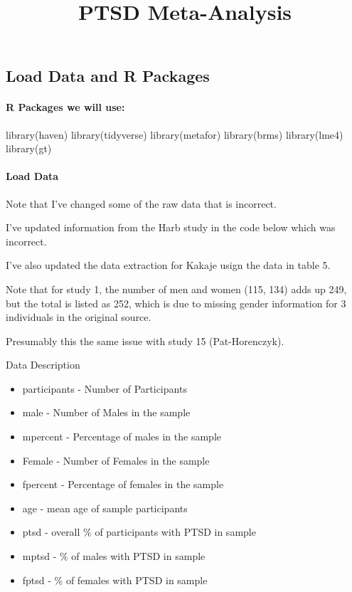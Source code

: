 \documentclass[
  letterpaper,
  DIV=11,
  numbers=noendperiod]{scrartcl}
\title{PTSD Meta-Analysis}
\author{}
\date{}
\let\oldparagraph\paragraph
\renewcommand{\paragraph}[1]{\oldparagraph{#1}\mbox{}}
\newenvironment{Shaded}{\begin{snugshade}}{\end{snugshade}}
\newcommand{\FunctionTok}[1]{\textcolor[rgb]{0.28,0.35,0.67}{#1}}
\newcommand{\NormalTok}[1]{\textcolor[rgb]{0.00,0.23,0.31}{#1}}
\renewcommand*\contentsname{Table of contents}
\newcommand\contentsname{Table of contents}
\begin{document}
\maketitle

\renewcommand*\contentsname{Table of contents}
{
\hypersetup{linkcolor=}
\setcounter{tocdepth}{3}
\tableofcontents
}
\subsection{Load Data and R Packages}\label{load-data-and-r-packages}

\paragraph{R Packages we will use:}\label{r-packages-we-will-use}

\begin{Shaded}
\begin{Highlighting}[]
\FunctionTok{library}\NormalTok{(haven)}
\FunctionTok{library}\NormalTok{(tidyverse)}
\FunctionTok{library}\NormalTok{(metafor)}
\FunctionTok{library}\NormalTok{(brms)}
\FunctionTok{library}\NormalTok{(lme4)}
\FunctionTok{library}\NormalTok{(gt)}
\end{Highlighting}
\end{Shaded}

\paragraph{Load Data}\label{load-data}

Note that I've changed some of the raw data that is incorrect.

I've updated information from the Harb study in the code below which was
incorrect.

I've also updated the data extraction for Kakaje usign the data in table
5.

Note that for study 1, the number of men and women (115, 134) adds up
249, but the total is listed as 252, which is due to missing gender
information for 3 individuals in the original source.

Presumably this the same issue with study 15 (Pat-Horenczyk).

Data Description

\begin{itemize}
\item
  participants - Number of Participants
\item
  male - Number of Males in the sample
\item
  mpercent - Percentage of males in the sample
\item
  Female - Number of Females in the sample
\item
  fpercent - Percentage of females in the sample
\item
  age - mean age of sample participants
\item
  ptsd - overall \% of participants with PTSD in sample
\item
  mptsd - \% of males with PTSD in sample
\item
  fptsd - \% of females with PTSD in sample
\end{itemize}
\end{document}
